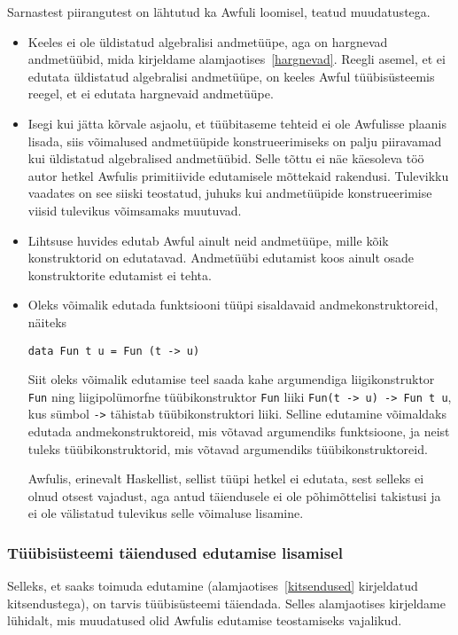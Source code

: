 \documentclass[12pt]{article}
\begin{document}
        Sarnastest piirangutest on lähtutud ka Awfuli loomisel, teatud muudatustega.

        \begin{itemize}
          \item
            Keeles ei ole üldistatud algebralisi andmetüüpe, aga on hargnevad andmetüübid, mida kirjeldame alamjaotises~\ref{hargnevad}. Reegli asemel, et ei edutata üldistatud algebralisi andmetüüpe, on keeles Awful tüübisüsteemis reegel, et ei edutata hargnevaid andmetüüpe.
          \item
            Isegi kui jätta kõrvale asjaolu, et tüübitaseme tehteid ei ole Awfulisse plaanis lisada, siis võimalused andmetüüpide konstrueerimiseks on palju piiravamad kui üldistatud algebralised andmetüübid. Selle tõttu ei näe käesoleva töö autor hetkel Awfulis primitiivide edutamisele mõttekaid rakendusi. Tulevikku vaadates on see siiski teostatud, juhuks kui andmetüüpide konstrueerimise viisid tulevikus võimsamaks muutuvad.
          \item
            Lihtsuse huvides edutab Awful ainult neid andmetüüpe, mille kõik konstruktorid on edutatavad. Andmetüübi edutamist koos ainult osade konstruktorite edutamist ei tehta.
          \item
            Oleks võimalik edutada funktsiooni tüüpi sisaldavaid andmekonstruktoreid, näiteks

            \begin{verbatim}data Fun t u = Fun (t -> u)\end{verbatim}

            Siit oleks võimalik edutamise teel saada kahe argumendiga liigikonstruktor \verb!Fun! ning liigipolümorfne tüübikonstruktor \verb!Fun! liiki \verb!Fun(t -> u) -> Fun t u!, kus sümbol \verb!->! tähistab tüübikonstruktori liiki. Selline edutamine võimaldaks edutada andmekonstruktoreid, mis võtavad argumendiks funktsioone, ja neist tuleks tüübikonstruktorid, mis võtavad argumendiks tüübikonstruktoreid.

            Awfulis, erinevalt Haskellist, sellist tüüpi hetkel ei edutata, sest selleks ei olnud otsest vajadust, aga antud täiendusele ei ole põhimõttelisi takistusi ja ei ole välistatud tulevikus selle võimaluse lisamine.
        \end{itemize}
      \subsubsection{Tüübisüsteemi täiendused edutamise lisamisel}
        Selleks, et saaks toimuda edutamine (alamjaotises~\ref{kitsendused} kirjeldatud kitsendustega), on tarvis tüübisüsteemi täiendada. Selles alamjaotises kirjeldame lühidalt, mis muudatused olid Awfulis edutamise teostamiseks vajalikud.
\end{document}

